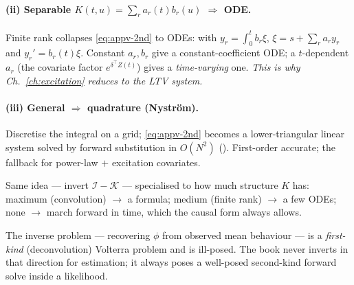 \paragraph{(ii) Separable $K(t,u)=\sum_r a_r(t)b_r(u)$ $\Rightarrow$ ODE.} Finite
rank collapses \eqref{eq:appv-2nd} to ODEs: with $y_r=\int_0^t b_r\xi$,
$\xi=s+\sum_r a_r y_r$ and $y_r'=b_r(t)\xi$. Constant $a_r,b_r$ give a constant-coefficient
ODE; a $t$-dependent $a_r$ (the covariate factor $e^{\delta^\top Z(t)}$) gives a
\emph{time-varying} one. \emph{This is why Ch.~\ref{ch:excitation} reduces to the LTV
system.}

\paragraph{(iii) General $\Rightarrow$ quadrature (Nystr\"om).} Discretise the
integral on a grid; \eqref{eq:appv-2nd} becomes a lower-triangular linear system
solved by forward substitution in $O(N^2)$ ().
First-order accurate; the fallback for power-law $+$ excitation covariates.

\begin{intuitionbox}
Same idea --- invert $\mathcal I-\mathcal K$ --- specialised to how much structure
$K$ has: maximum (convolution) $\to$ a formula; medium (finite rank) $\to$ a few
ODEs; none $\to$ march forward in time, which the causal form always allows.
\end{intuitionbox}

\begin{pitfall}
The inverse problem --- recovering $\phi$ from observed mean behaviour --- is a
\emph{first-kind} (deconvolution) Volterra problem and is ill-posed. The book never
inverts in that direction for estimation; it always poses a well-posed second-kind
forward solve inside a likelihood.
\end{pitfall}
